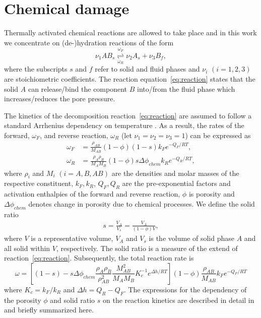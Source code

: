 \documentclass[]{scrreprt}
\begin{document}
\section{Chemical damage}
\label{subsec:chem_damage}

Thermally activated chemical reactions are allowed to take place and
in this work we concentrate on (de-)hydration reactions of the form
\begin{equation}
  \label{eq:reaction}
  \nu_1 AB_{s} 
  \overset{\omega_F}{\underset{\omega_R}{\rightleftharpoons}} \nu_2 A_{s} + \nu_3 B_{f},
\end{equation} 
where the subscripts $s$ and $f$ refer to solid and fluid phases and $\nu_i$
$(i=1,2,3)$ are stoichiometric coefficients.  The reaction
equation~\eqref{eq:reaction} states that the solid $A$ can release/bind the
component $B$ into/from the fluid phase which increases/reduces the pore pressure.

The kinetics of the decomposition reaction~\eqref{eq:reaction} are assumed
to follow a standard Arrhenius dependency on temperature 
\citep{Poulet2014}. As a result, the rates of the forward, $\omega_F$, and
reverse reaction, $\omega_R$ (let $\nu_1=\nu_2=\nu_3=1$) can
be expressed as \citep{Alevizos2014}
\begin{subequations}
\label{eq:reaction_rates_txt}
\begin{align}
  \omega_F &=  \frac{\rho_{AB}}{M_{AB}} (1 - \phi)(1 - s)  k_F e^{-Q_F/RT}, \\
  \omega_R &=  \frac{\rho_{A} \rho_{B}}{M_A M_B} (1 - \phi) s \Delta\phi_{chem}
  k_R e^{-Q_R/RT},
\end{align}
\end{subequations}
where $\rho_i$ and $M_i$ $(i = A, B, AB)$ are the densities and molar masses of
the respective constituent,
$k_F,k_R$, $Q_F,Q_R$ are the pre-exponential factors and activation enthalpies
of the forward and reverse reaction,
$\phi$ is porosity and $\Delta\phi_{chem}$ denotes change in porosity due to 
chemical processes. We define the solid ratio
\begin{eqnarray}
    \label{eq:s}
    s = \frac{V_{A}}{V_s} = \frac{V_{A}}{(1-\phi) V},
\end{eqnarray}
where $V$ is a representative volume, $V_A$ and $V_s$ is the volume of solid
phase $A$ and all solid within $V$, respectively. The solid ratio is a measure
of the extend of reaction~\eqref{eq:reaction}. Subsequently, the total
reaction rate is
\begin{equation}
 \label{eq:reaction_rate_total}
\omega = \left[(1 - s) - s  \Delta \phi_{chem} \frac{\rho_{A}
\rho_{B}}{\rho^2_{AB}} \frac{M^2_{AB}}{M_A M_B} K^{-1}_c e^{\Delta h/RT}
\right] (1 - \phi) \frac{\rho_{AB}}{M_{AB}} k_F e^{-Q_F/RT}
\end{equation}
where $K_c = k_F/k_R$ and $\Delta h = Q_R - Q_F$.  The expressions for the
dependency of the porosity $\phi$ and solid ratio $s$ on the reaction kinetics
are described in detail in \cite{Alevizos2014} and briefly summarized here.
\end{document}
